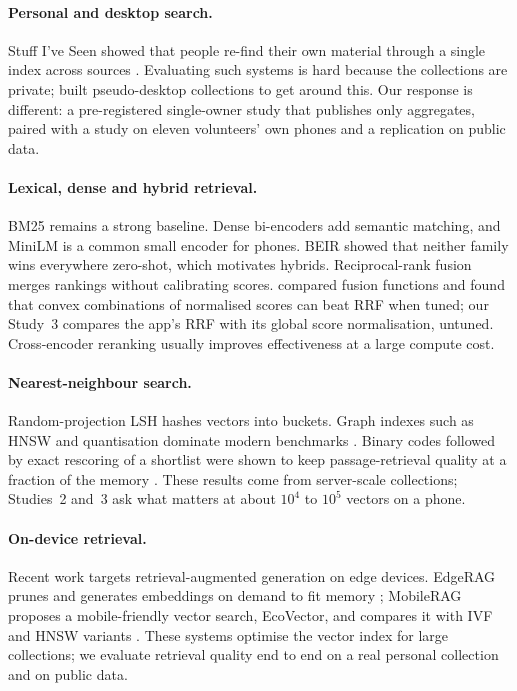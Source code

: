 \documentclass[pdflatex,sn-basic,Numbered]{sn-jnl}
\begin{document}
\paragraph{Personal and desktop search.} Stuff I've Seen showed that people re-find their own material through a single index across sources \citep{dumais2003sis}. Evaluating such systems is hard because the collections are private; \citet{kim2009pseudodesktop} built pseudo-desktop collections to get around this. Our response is different: a pre-registered single-owner study that publishes only aggregates, paired with a study on eleven volunteers' own phones and a replication on public data.

\paragraph{Lexical, dense and hybrid retrieval.} BM25 \citep{robertson2009bm25} remains a strong baseline. Dense bi-encoders \citep{reimers2019sbert,karpukhin2020dpr} add semantic matching, and MiniLM \citep{wang2020minilm} is a common small encoder for phones. BEIR \citep{thakur2021beir} showed that neither family wins everywhere zero-shot, which motivates hybrids. Reciprocal-rank fusion \citep{cormack2009rrf} merges rankings without calibrating scores. \citet{bruch2023fusion} compared fusion functions and found that convex combinations of normalised scores can beat RRF when tuned; our Study~3 compares the app's RRF with its global score normalisation, untuned. Cross-encoder reranking \citep{nogueira2019bert} usually improves effectiveness at a large compute cost.

\paragraph{Nearest-neighbour search.} Random-projection LSH \citep{indyk1998lsh,charikar2002simhash} hashes vectors into buckets. Graph indexes such as HNSW \citep{malkov2020hnsw} and quantisation \citep{jegou2011pq} dominate modern benchmarks \citep{aumuller2020ann,johnson2021faiss}. Binary codes followed by exact rescoring of a shortlist were shown to keep passage-retrieval quality at a fraction of the memory \citep{yamada2021bpr}. These results come from server-scale collections; Studies~2 and~3 ask what matters at about $10^4$ to $10^5$ vectors on a phone.

\paragraph{On-device retrieval.} Recent work targets retrieval-augmented generation on edge devices. EdgeRAG prunes and generates embeddings on demand to fit memory \citep{seemakhupt2024edgerag}; MobileRAG proposes a mobile-friendly vector search, EcoVector, and compares it with IVF and HNSW variants \citep{park2025mobilerag}. These systems optimise the vector index for large collections; we evaluate retrieval quality end to end on a real personal collection and on public data.
\end{document}
